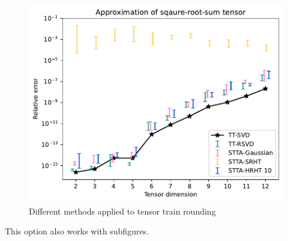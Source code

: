 \documentclass{article}
\begin{document}
\begin{figure}[H]
    \centering
    \includegraphics[width=0.8\linewidth]{Images/C_sqrt_sum_d.pdf}
    \caption{Different methods applied to tensor train rounding}
    \label{fig:methods tt rounding}
\end{figure}

This option also works with subfigures.
\end{document}
